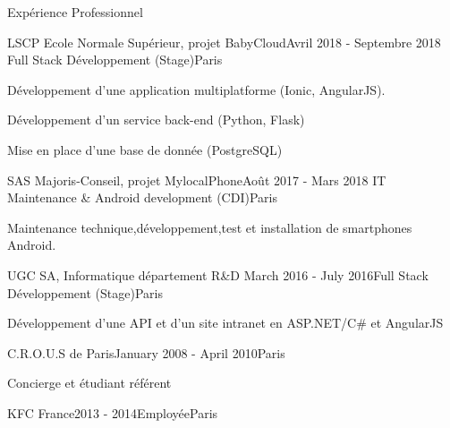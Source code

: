 \documentclass{resume} %
\begin{document}
\begin{rSection}{Expérience Professionnel}
	
	\begin{rSubsection}{LSCP Ecole Normale Supérieur, projet BabyCloud}{Avril 2018 - Septembre 2018 }{Full Stack Développement (Stage)}{Paris}
		\item Développement d'une application multiplatforme (Ionic, AngularJS).
		\item Développement d'un service back-end (Python, Flask)
		\item Mise en place d'une base de donnée (PostgreSQL)
	\end{rSubsection}
	
	\begin{rSubsection}{SAS Majoris-Conseil, projet MylocalPhone}{Août 2017 - Mars 2018 }{IT Maintenance \& Android development (CDI)}{Paris}
		\item Maintenance technique,développement,test et installation de smartphones Android.
	\end{rSubsection}
	
	
	\begin{rSubsection}{UGC SA, Informatique département R\&D  }{March 2016 - July 2016}{Full Stack Développement (Stage)}{Paris}
		\item Développement d'une API et d'un site intranet en ASP.NET/C\# et AngularJS
	\end{rSubsection}
	
	
	\begin{rSubsection}{C.R.O.U.S de Paris}{January 2008 - April 2010}{}{Paris}
		\item Concierge et étudiant référent
	\end{rSubsection}
	
	
	\begin{rSubsection}{KFC France}{2013 - 2014}{Employée}{Paris}
		\item
	\end{rSubsection}
\end{rSection}

\end{document}
